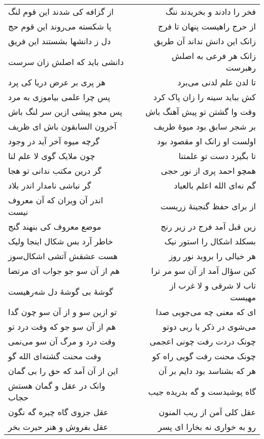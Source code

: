 \begin{center}
\begin{longtable}{l p{0.5cm} r}
از گزافه کی شدند این قوم لنگ
&&
فخر را دادند و بخریدند ننگ
\\
پا شکسته می‌روند این قوم حج
&&
از حرج راهیست پنهان تا فرج
\\
دل ز دانشها بشستند این فریق
&&
زانک این دانش نداند آن طریق
\\
دانشی باید که اصلش زان سرست
&&
زانک هر فرعی به اصلش رهبرست
\\
هر پری بر عرض دریا کی پرد
&&
تا لدن علم لدنی می‌برد
\\
پس چرا علمی بیاموزی به مرد
&&
کش بباید سینه را زان پاک کرد
\\
پس مجو پیشی ازین سر لنگ باش
&&
وقت وا گشتن تو پیش آهنگ باش
\\
آخرون السابقون باش ای ظریف
&&
بر شجر سابق بود میوهٔ طریف
\\
گرچه میوه آخر آید در وجود
&&
اولست او زانک او مقصود بود
\\
چون ملایک گوی لا علم لنا
&&
تا بگیرد دست تو علمتنا
\\
گر درین مکتب ندانی تو هجا
&&
همچو احمد پری از نور حجی
\\
گر نباشی نامدار اندر بلاد
&&
گم نه‌ای الله اعلم بالعباد
\\
اندر آن ویران که آن معروف نیست
&&
از برای حفظ گنجینهٔ زریست
\\
موضع معروف کی بنهند گنج
&&
زین قبل آمد فرج در زیر رنج
\\
خاطر آرد بس شکال اینجا ولیک
&&
بسکلد اشکال را استور نیک
\\
هست عشقش آتشی اشکال‌سوز
&&
هر خیالی را بروبد نور روز
\\
هم از آن سو جو جواب ای مرتضا
&&
کین سؤال آمد از آن سو مر ترا
\\
گوشهٔ بی گوشهٔ دل شه‌رهیست
&&
تاب لا شرقی و لا غرب از مهیست
\\
تو ازین سو و از آن سو چون گدا
&&
ای که معنی چه می‌جویی صدا
\\
هم از آن سو جو که وقت درد تو
&&
می‌شوی در ذکر یا ربی دوتو
\\
وقت درد و مرگ آن سو می‌نمی
&&
چونک دردت رفت چونی اعجمی
\\
وقت محنت گشته‌ای الله گو
&&
چونک محنت رفت گویی راه کو
\\
این از آن آمد که حق را بی گمان
&&
هر که بشناسد بود دایم بر آن
\\
وانک در عقل و گمان هستش حجاب
&&
گاه پوشیدست و گه بدریده جیب
\\
عقل جزوی گاه چیره گه نگون
&&
عقل کلی آمن از ریب المنون
\\
عقل بفروش و هنر حیرت بخر
&&
رو به خواری نه بخارا ای پسر
\\

\end{longtable}
\end{center}
